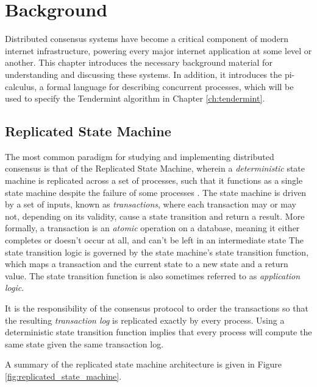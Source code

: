 \chapter{Background}
\label{ch:background}

\renewcommand{\|}{\;|\;}

Distributed consensus systems have become a critical component of modern internet infrastructure, 
powering every major internet application at some level or another.
This chapter introduces the necessary background material for understanding and discussing these systems.
In addition, it introduces the pi-calculus, a formal language for describing concurrent processes,
which will be used to specify the Tendermint algorithm in Chapter \ref{ch:tendermint}.

\section{Replicated State Machine}

The most common paradigm for studying and implementing distributed consensus is that of the Replicated State Machine, 
wherein a \emph{deterministic} state machine is replicated across a set of processes, 
such that it functions as a single state machine 
despite the failure of some processes \cite{schneider1990implementing}.
The state machine is driven by a set of inputs, known as \emph{transactions}, 
where each transaction may or may not, depending on its validity, cause a state transition and return a result.
More formally, a transaction is an \emph{atomic} operation on a database, 
meaning it either completes or doesn't occur at all, 
and can't be left in an intermediate state \cite{gray1981transaction}
The state transition logic is governed by the state machine's state transition function,
which maps a transaction and the current state to a new state and a return value.
The state transition function is also sometimes referred to as \emph{application logic}.

It is the responsibility of the consensus protocol to order the transactions so that the resulting 
\emph{transaction log} is replicated exactly by every process.
Using a deterministic state transition function implies that 
every process will compute the same state given the same transaction log.

A summary of the replicated state machine architecture is given in Figure \ref{fig:replicated_state_machine}.

